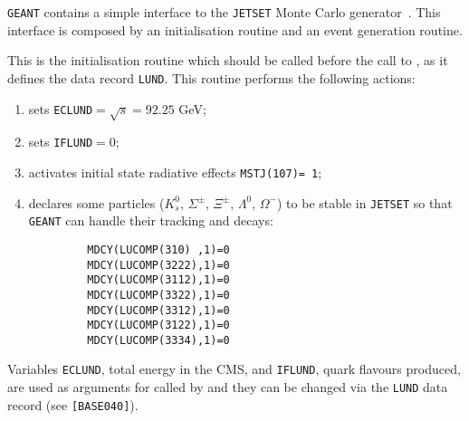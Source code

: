                
               


{\tt GEANT} contains a simple interface to the {\tt JETSET} Monte
Carlo generator~\cite{bib-JETS}. This interface is composed by an
initialisation routine and an event generation routine.

This is the initialisation routine which should be called before the
call to , as it defines the data record {\tt LUND}. This routine
performs the following actions:
\begin{enumerate}
\item sets {\tt ECLUND}$=\sqrt{s}=92.25$ GeV;
\item sets {\tt IFLUND}$=0$;
\item activates initial state radiative effects {\tt MSTJ(107)= 1};
\item declares some particles ($K^0_s$, $\Sigma^{\pm}$, $\Xi^{\pm}$,
$\Lambda^0$, $\Omega^-$) to be stable in {\tt JETSET} so that {\tt GEANT}
can handle their tracking and decays:
\begin{verbatim}
         MDCY(LUCOMP(310) ,1)=0
         MDCY(LUCOMP(3222),1)=0
         MDCY(LUCOMP(3112),1)=0
         MDCY(LUCOMP(3322),1)=0
         MDCY(LUCOMP(3312),1)=0
         MDCY(LUCOMP(3122),1)=0
         MDCY(LUCOMP(3334),1)=0
\end{verbatim}
\end{enumerate}

Variables {\tt ECLUND}, total energy in the CMS, and {\tt IFLUND}, quark
flavours produced, are used as arguments for  called by
 and they can be changed via the {\tt LUND} data record
(see {\tt [BASE040]}).

